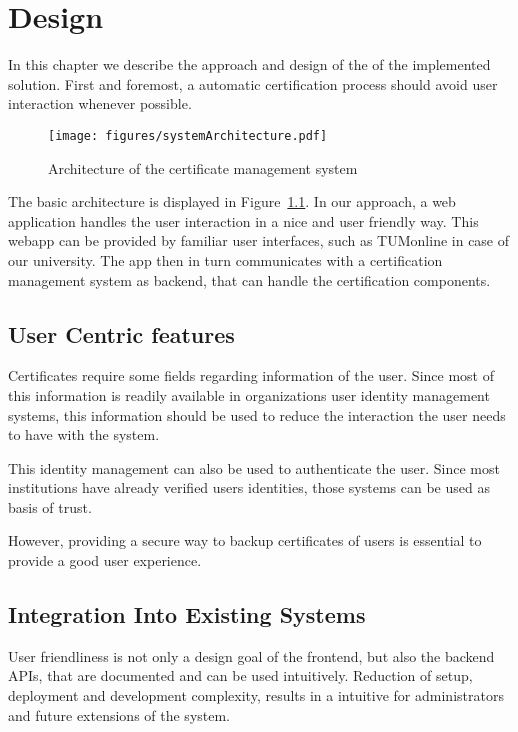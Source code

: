 \chapter{Design}\label{ch:design}

In this chapter we describe the approach and design of the of the implemented solution.
First and foremost, a automatic certification process should avoid user interaction whenever possible.

\begin{figure}
    \centering
    \texttt{[image: figures/systemArchitecture.pdf]} %
    \caption{Architecture of the certificate management system}
    \label{fig:systemArchitecture}
\end{figure}

The basic architecture is displayed in Figure~\ref{fig:systemArchitecture}.
In our approach, a web application handles the user interaction in a nice and user friendly way.
This webapp can be provided by familiar user interfaces, such as TUMonline in case of our university.
The app then in turn communicates with a certification management system as backend, that can handle the certification
components.

\section{User Centric features}\label{sec:userDetails}
Certificates require some fields regarding information of the user.
Since most of this information is readily available in organizations user identity management systems, this information
should be used to reduce the interaction the user needs to have with the system.

This identity management can also be used to authenticate the user.
Since most institutions have already verified users identities, those systems can be used as basis of trust.

However, providing a secure way to backup certificates of users is essential to provide a good user experience.

\section{Integration Into Existing Systems}\label{sec:integrationIntoExistingSystems}
User friendliness is not only a design goal of the frontend, but also the backend APIs, that are documented and can be
used intuitively.
Reduction of setup, deployment and development complexity, results in a intuitive for administrators and future
extensions of the system.

